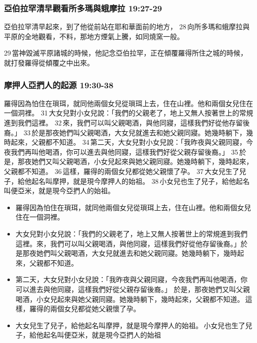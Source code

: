 \subsubsection{亞伯拉罕清早觀看所多瑪與蛾摩拉 19:27-29}
亞伯拉罕清早起來，到了他從前站在耶和華面前的地方， 28 向所多瑪和蛾摩拉與平原的全地觀看，不料，那地方煙氣上騰，如同燒窯一般。

29 當神毀滅平原諸城的時候，他記念亞伯拉罕，正在傾覆羅得所住之城的時候，就打發羅得從傾覆之中出來。



\subsubsection{摩押人亞捫人的起源 19:30-38}
羅得因為怕住在瑣珥，就同他兩個女兒從瑣珥上去，住在山裡。他和兩個女兒住在一個洞裡。 31 大女兒對小女兒說：「我們的父親老了，地上又無人按著世上的常規進到我們這裡。 32 來，我們可以叫父親喝酒，與他同寢，這樣我們好從他存留後裔。」 33 於是那夜她們叫父親喝酒，大女兒就進去和她父親同寢。她幾時躺下，幾時起來，父親都不知道。 34 第二天，大女兒對小女兒說：「我昨夜與父親同寢，今夜我們再叫他喝酒，你可以進去與他同寢，這樣我們好從父親存留後裔。」 35 於是，那夜她們又叫父親喝酒，小女兒起來與她父親同寢。她幾時躺下，幾時起來，父親都不知道。 36 這樣，羅得的兩個女兒都從她父親懷了孕。 37 大女兒生了兒子，給他起名叫摩押，就是現今摩押人的始祖。 38 小女兒也生了兒子，給他起名叫便亞米，就是現今亞捫人的始祖。



\noindent 
\begin{itemize} 
\itemsep-.35em 
\item 羅得因為怕住在瑣珥，就同他兩個女兒從瑣珥上去，住在山裡。他和兩個女兒住在一個洞裡。 
\item 大女兒對小女兒說：「我們的父親老了，地上又無人按著世上的常規進到我們這裡。來，我們可以叫父親喝酒，與他同寢，這樣我們好從他存留後裔。」於是那夜她們叫父親喝酒，大女兒就進去和她父親同寢。她幾時躺下，幾時起來，父親都不知道。 
\item 第二天，大女兒對小女兒說：「我昨夜與父親同寢，今夜我們再叫他喝酒，你可以進去與他同寢，這樣我們好從父親存留後裔。」 於是，那夜她們又叫父親喝酒，小女兒起來與她父親同寢。她幾時躺下，幾時起來，父親都不知道。 這樣，羅得的兩個女兒都從她父親懷了孕。 
\item 大女兒生了兒子，給他起名叫摩押，就是現今摩押人的始祖。 小女兒也生了兒子，給他起名叫便亞米，就是現今亞捫人的始祖
\end{itemize}
 

